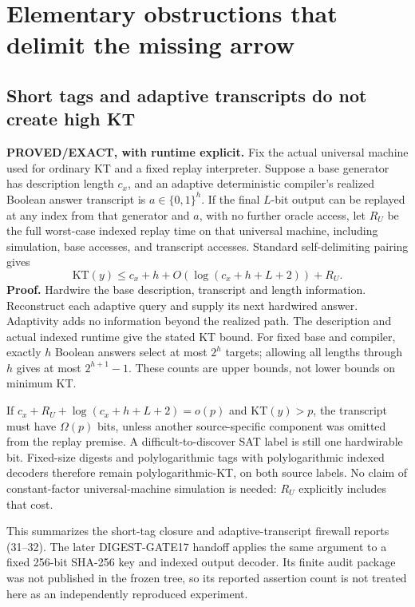 \documentclass[11pt]{article}
\begin{document}
\section{Elementary obstructions that delimit the missing arrow}

\subsection{Short tags and adaptive transcripts do not create high KT}

\textbf{PROVED/EXACT, with runtime explicit.}
Fix the actual universal machine used for ordinary KT and a fixed replay
interpreter. Suppose a base generator has description length $c_x$, and an
adaptive deterministic compiler's realized Boolean answer transcript is
$a\in\{0,1\}^h$. If the final $L$-bit output can be replayed at any index
from that generator and $a$, with no further oracle access, let $R_U$ be the
full worst-case indexed replay time on that universal machine, including
simulation, base accesses, and transcript accesses. Standard self-delimiting
pairing gives
\[
 \mathrm{KT}(y)\leq c_x+h+O(\log(c_x+h+L+2))+R_U.
\]
\textbf{Proof.} Hardwire the base description, transcript and length
information. Reconstruct each adaptive query and supply its next hardwired
answer. Adaptivity adds no information beyond the realized path. The
description and actual indexed runtime give the stated KT bound.
For fixed base and compiler, exactly $h$ Boolean answers select at most
$2^h$ targets; allowing all lengths through $h$ gives at most
$2^{h+1}-1$. These counts are upper bounds, not lower bounds on minimum KT.

If $c_x+R_U+\log(c_x+h+L+2)=o(p)$ and $\mathrm{KT}(y)>p$, the transcript
must have $\Omega(p)$ bits, unless another source-specific component was
omitted from the replay premise. A difficult-to-discover SAT label is still
one hardwirable bit. Fixed-size digests and polylogarithmic tags with
polylogarithmic indexed decoders therefore remain polylogarithmic-KT, on
both source labels. No claim of constant-factor universal-machine simulation
is needed: $R_U$ explicitly includes that cost.

This summarizes the short-tag closure and adaptive-transcript firewall
reports (31--32). The later DIGEST-GATE17 handoff applies the
same argument to a fixed 256-bit SHA-256 key and indexed output decoder.
Its finite audit package was not published in the frozen tree, so its
reported assertion count is not treated here as an independently reproduced
experiment.
\end{document}
